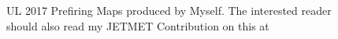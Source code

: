 \begin{figure}[h]%
    \centering
    \qquad
    \caption{UL 2017 Prefiring Maps produced by Myself. The interested reader should also read my JETMET Contribution on this at \cite{UL2017}}%
    \label{UL_2017}%
\end{figure}




